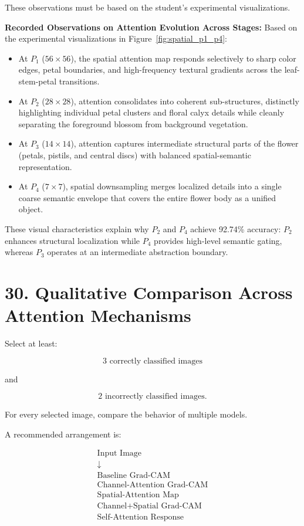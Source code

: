 \documentclass[10pt]{article}
\begin{document}
These observations must be based on the student's experimental
visualizations.

\textbf{Recorded Observations on Attention Evolution Across Stages:}
Based on the experimental visualizations in Figure~\ref{fig:spatial_p1_p4}:
\begin{itemize}
\item At $P_1$ ($56\times56$), the spatial attention map responds selectively to sharp color edges, petal boundaries, and high-frequency textural gradients across the leaf-stem-petal transitions.
\item At $P_2$ ($28\times28$), attention consolidates into coherent sub-structures, distinctly highlighting individual petal clusters and floral calyx details while cleanly separating the foreground blossom from background vegetation.
\item At $P_3$ ($14\times14$), attention captures intermediate structural parts of the flower (petals, pistils, and central discs) with balanced spatial-semantic representation.
\item At $P_4$ ($7\times7$), spatial downsampling merges localized details into a single coarse semantic envelope that covers the entire flower body as a unified object.
\end{itemize}
These visual characteristics explain why $P_2$ and $P_4$ achieve 92.74\% accuracy: $P_2$ enhances structural localization while $P_4$ provides high-level semantic gating, whereas $P_3$ operates at an intermediate abstraction boundary.

\section*{30. Qualitative Comparison Across Attention Mechanisms}

Select at least:

\[
\boxed{
3\text{ correctly classified images}
}
\]

and

\[
\boxed{
2\text{ incorrectly classified images}.
}
\]

For every selected image, compare the behavior of multiple models.

A recommended arrangement is:

\[
\boxed{
\begin{array}{c}
\text{Input Image}\\
\downarrow\\
\text{Baseline Grad-CAM}\\
\text{Channel-Attention Grad-CAM}\\
\text{Spatial-Attention Map}\\
\text{Channel+Spatial Grad-CAM}\\
\text{Self-Attention Response}
\end{array}
}
\]
\end{document}

